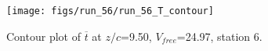 \begin{figure}[H]
\centering
\texttt{[image: figs/run\_56/run\_56\_T\_contour]}
\caption{Contour plot of $\overline{t}$ at $z/c$=9.50, $V_{free}$=24.97, station 6.}
\label{fig:run_56_T_contour}
\end{figure}


